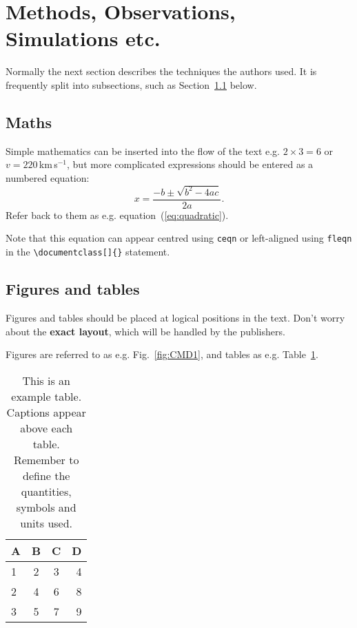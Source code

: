 \section{Methods, Observations, Simulations etc.}
\label{sec:method} %
Normally the next section describes the techniques the authors used.
It is frequently split into subsections, such as Section~\ref{sec:maths} below.
\subsection{Maths}
\label{sec:maths} %
Simple mathematics can be inserted into the flow of the text e.g. $2\times3=6$
or $v=220$\,km\,s$^{-1}$, but more complicated expressions should be entered
as a numbered equation:
    \begin{equation}
        x=\frac{-b\pm\sqrt{b^2-4ac}}{2a}.
    	\label{eq:quadratic}
    \end{equation}
Refer back to them as e.g. equation~(\ref{eq:quadratic}). 

Note that this equation can appear centred using 
\verb'ceqn' or left-aligned using \verb'fleqn' in the \verb'\documentclass[]{}' statement.

\subsection{Figures and tables}

Figures and tables should be placed at logical positions in the text. Don't worry about the\textbf{ exact layout}, which will be handled by the publishers.

Figures are referred to as e.g. Fig.~\ref{fig:CMD1}, and tables as e.g. Table~\ref{tab:example_table}.


\begin{table}
	\centering
	\caption{This is an example table. Captions appear above each table.
	Remember to define the quantities, symbols and units used.}
	\label{tab:example_table}
	\begin{tabular}{lccr} %
		\hline
		A & B & C & D\\
		\hline
		1 & 2 & 3 & 4\\
		2 & 4 & 6 & 8\\
		3 & 5 & 7 & 9\\
		\hline
	\end{tabular}
\end{table}

